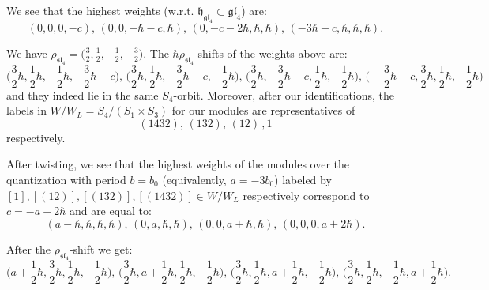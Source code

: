 \documentclass[12pt]{amsart}
\begin{document}
We see that the highest weights (w.r.t. $\mathfrak{h}_{\mathfrak{gl}_4} \subset \mathfrak{gl}_4$) are: 
\begin{equation*}
(0,0,0,-c),\, (0,0,-\hbar-c,\hbar),\, (0,-c-2\hbar,\hbar,\hbar),\, (-3\hbar-c,\hbar,\hbar,\hbar).
\end{equation*}




    
We have $\rho_{\mathfrak{sl}_4}=\Big(\frac{3}{2},\frac{1}{2},-\frac{1}{2},-\frac{3}{2}\Big)$.      The $\hbar\rho_{\mathfrak{sl}_4}$-shifts of the weights above are:
\begin{equation*}
\Big(\frac{3}{2}\hbar,\frac{1}{2}\hbar,-\frac{1}{2}\hbar,-\frac{3}{2}\hbar-c\Big),\, \Big(\frac{3}{2}\hbar,\frac{1}{2}\hbar,-\frac{3}{2}\hbar-c,-\frac{1}{2}\hbar\Big),\, \Big(\frac{3}{2}\hbar,-\frac{3}{2}\hbar-c,\frac{1}{2}\hbar,-\frac{1}{2}\hbar\Big),\, \Big(-\frac{3}{2}\hbar-c,\frac{3}{2}\hbar,\frac{1}{2}\hbar,-\frac{1}{2}\hbar\Big)
\end{equation*}
and they indeed lie in the same $S_4$-orbit. Moreover, after our identifications, the labels in $W/W_L=S_4/(S_1 \times S_3)$ for our modules are representatives of 
\begin{equation*}
(1432),\, (132),\,(12)\,,1
\end{equation*}
respectively.



After twisting, we see that the highest weights of the modules over the quantization with period $b=b_0$ (equivalently, $a=-3b_0$) labeled by $[1], [(12)], [(132)], [(1432)] \in W/W_L$ respectively correspond to $c=-a-2\hbar$ and are equal to:
\begin{equation*}
(a-\hbar,\hbar,\hbar,\hbar),\, (0,a,\hbar,\hbar),\, (0,0,a+\hbar,\hbar),\, (0,0,0,a+2\hbar).
\end{equation*}

After the $\rho_{\mathfrak{sl}_4}$-shift we get:
\begin{equation*}
\Big(a+\frac{1}{2}\hbar,\frac{3}{2}\hbar,\frac{1}{2}\hbar,-\frac{1}{2}\hbar\Big),\, \Big(\frac{3}{2}\hbar,a+\frac{1}{2}\hbar,\frac{1}{2}\hbar,-\frac{1}{2}\hbar\Big),\, \Big(\frac{3}{2}\hbar,\frac{1}{2}\hbar,a+\frac{1}{2}\hbar,-\frac{1}{2}\hbar\Big),\, \Big(\frac{3}{2}\hbar,\frac{1}{2}\hbar,-\frac{1}{2}\hbar,a+\frac{1}{2}\hbar\Big).
\end{equation*}
\end{document}
